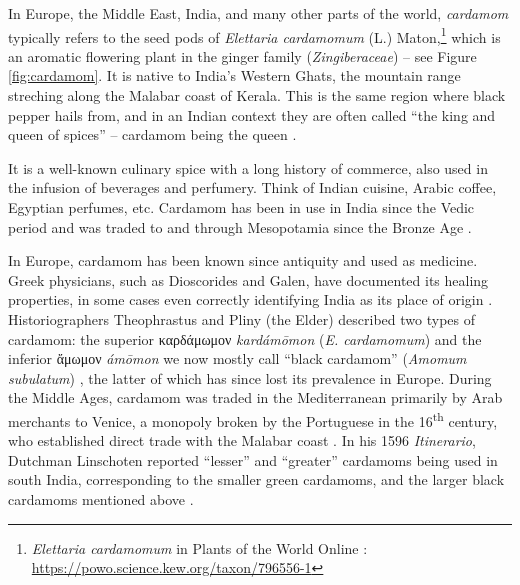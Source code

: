 \documentclass[12pt]{article}
\begin{document}

In Europe, the Middle East, India, and many other parts of the world, \textit{cardamom} typically refers to the seed pods of \textit{Elettaria cardamomum} (L.) Maton,\footnote{\textit{Elettaria cardamomum} in Plants of the World Online \parencite{powo}: \url{https://powo.science.kew.org/taxon/796556-1}} which is an aromatic flowering plant in the ginger family (\textit{Zingiberaceae}) -- see Figure \ref{fig:cardamom}. It is native to India's Western Ghats, the mountain range streching along the Malabar coast of Kerala. This is the same region where black pepper hails from, and in an Indian context they are often called ``the king and queen of spices'' -- cardamom being the queen \parencite{nair_2020_geographya}. 

It is a well-known culinary spice with a long history of commerce, also used in the infusion of beverages and perfumery. Think of Indian cuisine, Arabic coffee, Egyptian perfumes, etc. Cardamom has been in use in India since the Vedic period and was traded to and through Mesopotamia since the Bronze Age \parencite{ravindran_2002_cardamom}. 

In Europe, cardamom has been known since antiquity and used as medicine. Greek physicians, such as Dioscorides and Galen, have documented its healing properties, in some cases even correctly identifying India as its place of origin \parencites{parry_1969_spices}{anderson_2023_history}. Historiographers Theophrastus and Pliny (the Elder) described two types of cardamom: the superior καρδάμωμον \textit{kardámōmon} (\textit{E. cardamomum}) and the inferior ἄμωμον \textit{ámōmon} we now mostly call ``black cardamom'' (\textit{Amomum subulatum}) \parencite{prance_2005_cultural}, the latter of which has since lost its prevalence in Europe. During the Middle Ages, cardamom was traded in the Mediterranean primarily by Arab merchants to Venice, a monopoly broken by the Portuguese in the 16\textsuperscript{th} century, who established direct trade with the Malabar coast \parencite{cumo_2013_encyclopedia}. In his 1596 \textit{Itinerario}, Dutchman Linschoten reported ``lesser'' and ``greater'' cardamoms being used in south India, corresponding to the smaller green cardamoms, and the larger black cardamoms mentioned above \parencite{nair_2006_agronomy}.
\end{document}
